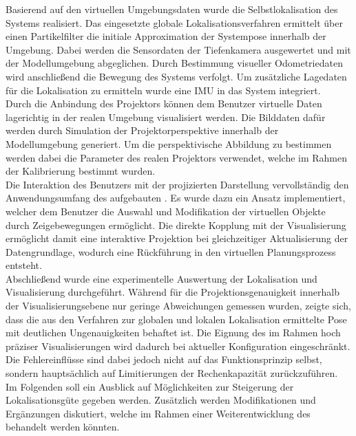 Basierend auf den virtuellen Umgebungsdaten wurde die Selbstlokalisation des Systems realisiert. Das eingesetzte globale Lokalisationsverfahren ermittelt über einen Partikelfilter die initiale Approximation der Systempose innerhalb der Umgebung. Dabei werden die Sensordaten der Tiefenkamera ausgewertet und mit der Modellumgebung abgeglichen. Durch Bestimmung visueller Odometriedaten wird anschließend die Bewegung des Systems verfolgt. Um zusätzliche Lagedaten für die Lokalisation zu ermitteln wurde eine IMU in das System integriert.\\

Durch die Anbindung des Projektors können dem Benutzer virtuelle Daten lagerichtig in der realen Umgebung visualisiert werden. Die Bilddaten dafür werden durch Simulation der Projektorperspektive innerhalb der Modellumgebung generiert. Um die perspektivische Abbildung zu bestimmen werden dabei die Parameter des realen Projektors verwendet, welche im Rahmen der Kalibrierung bestimmt wurden.\\

Die Interaktion des Benutzers mit der projizierten Darstellung vervollständig den Anwendungsumfang des aufgebauten . Es wurde dazu ein Ansatz implementiert, welcher dem Benutzer die Auswahl und Modifikation der virtuellen Objekte durch Zeigebewegungen ermöglicht. Die direkte Kopplung mit der Visualisierung ermöglicht damit eine interaktive Projektion bei gleichzeitiger Aktualisierung der Datengrundlage, wodurch eine Rückführung in den virtuellen Planungsprozess entsteht.\\

Abschließend wurde eine experimentelle Auswertung der Lokalisation und Visualisierung durchgeführt. Während für die Projektionsgenauigkeit innerhalb der Visualisierungsebene nur geringe Abweichungen gemessen wurden, zeigte sich, dass die aus den Verfahren zur globalen und lokalen Lokalisation ermittelte Pose mit deutlichen Ungenauigkeiten behaftet ist. Die Eignung des  im Rahmen hoch präziser Visualisierungen wird dadurch bei aktueller Konfiguration eingeschränkt. Die Fehlereinflüsse sind dabei jedoch nicht auf das Funktionsprinzip selbst, sondern hauptsächlich auf Limitierungen der Rechenkapazität zurückzuführen.\\
Im Folgenden soll ein Ausblick auf Möglichkeiten zur Steigerung der Lokalisationsgüte gegeben werden. Zusätzlich werden Modifikationen und Ergänzungen diskutiert, welche im Rahmen einer Weiterentwicklung des  behandelt werden könnten.\\

